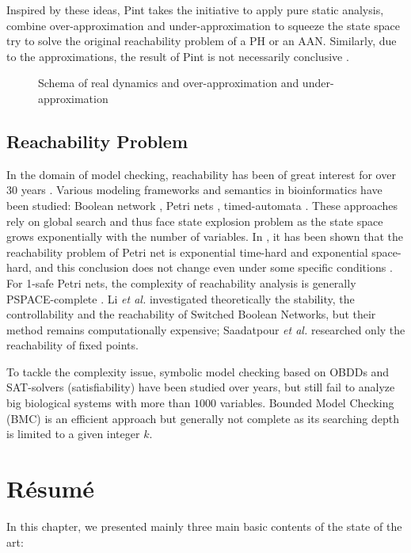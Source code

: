 Inspired by these ideas, Pint \cite{Pint} takes the initiative to apply pure static analysis, combine over-approximation and under-approximation to squeeze the state space try to solve the original reachability problem of a PH or an AAN.
Similarly, due to the approximations, the result of Pint is not necessarily conclusive \cite{folschette2015}.

\begin{figure}
    \centering
    
    \caption[Static analysis]{Schema of real dynamics and over-approximation and under-approximation}
    \label{fig:vennDiagram}
\end{figure}

\subsection{Reachability Problem}
In the domain of model checking, reachability has been of great interest for over 30 years \cite{clarke2008birth,clarke20142}. 
Various modeling frameworks and semantics in bioinformatics have been studied: Boolean network \cite{akutsu2007control}, Petri nets \cite{mayr1984,esparza1998}, timed-automata \cite{Daws1998,wozna2003}. 
These approaches rely on global search and thus face state explosion problem as the state space grows exponentially with the number of variables. 
In \cite{peterson1977petri}, it has been shown that the reachability problem of Petri net is exponential time-hard and exponential space-hard, and this conclusion does not change even under some specific conditions \cite{esparza1998}. 
For 1-safe Petri nets, the complexity of reachability analysis is generally PSPACE-complete \cite{cheng1995complexity}.
Li \textit{et al.} \cite{li2012reachability,li2014stability} investigated theoretically the stability, the controllability and the reachability of Switched Boolean Networks, but their method remains computationally expensive;
Saadatpour \textit{et al.} \cite{saadatpour2010attractor} researched only the reachability of fixed points.

To tackle the complexity issue, symbolic model checking \cite{burch1992symbolic} based on OBDDs and SAT-solvers (satisfiability) \cite{abdulla2000symbolic} have been studied over years, but still fail to analyze big biological systems with more than $1000$ variables. 
Bounded Model Checking (BMC) \cite{clarke2001bounded} is an efficient approach but generally not complete as its searching depth is limited to a given integer $k$.


\section{R\'esum\'e}
In this chapter, we presented mainly three main basic contents of the state of the art:

